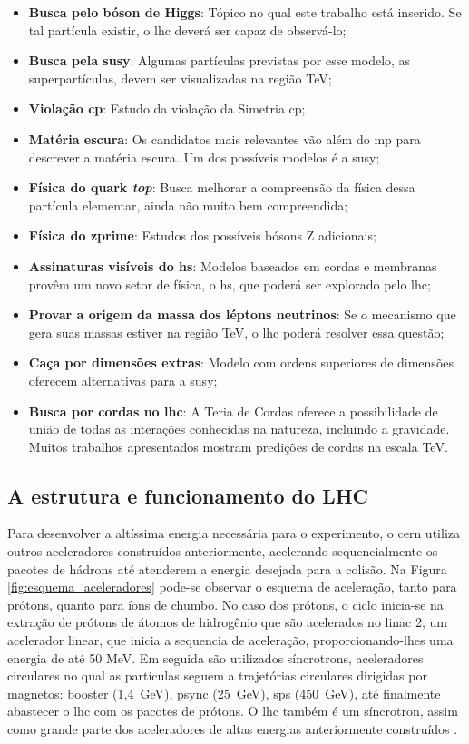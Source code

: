 \begin{itemize}
\item \textbf{Busca pelo bóson de Higgs}: Tópico no qual este trabalho está
inserido. Se tal partícula existir, o \gls{lhc} deverá ser capaz de observá-lo;
\item \textbf{Busca pela \gls{susy}}: Algumas partículas previstas por esse
modelo, as superpartículas, 
devem ser visualizadas na região TeV;
\item \textbf{Violação \gls{cp}}: Estudo da violação da Simetria \gls{cp};
\item \textbf{Matéria escura}: Os candidatos mais relevantes vão além do \gls{mp}
para descrever a matéria escura. Um dos possíveis modelos é a \gls{susy};
\item \textbf{Física do quark \emph{top}}: Busca melhorar a compreensão da física dessa
partícula elementar, ainda não muito bem compreendida;
\item \textbf{Física do \gls{zprime}}: Estudos dos possíveis bósons Z adicionais; 
\item \textbf{Assinaturas visíveis do \gls{hs}}: Modelos baseados em
cordas e membranas provêm um novo setor de física, o \gls{hs}, que poderá ser
explorado pelo \gls{lhc};
\item \textbf{Provar a origem da massa dos léptons neutrinos}: Se o mecanismo que gera
suas massas estiver na região TeV, o \gls{lhc} poderá resolver essa questão;
\item \textbf{Caça por dimensões extras}: Modelo com ordens superiores de dimensões
oferecem alternativas para a \gls{susy};
\item \textbf{Busca por cordas no \gls{lhc}}: A Teria de Cordas oferece a possibilidade de
união de todas as interações conhecidas na natureza, incluindo a gravidade. Muitos
trabalhos apresentados mostram predições de cordas na escala TeV.
\end{itemize}

\subsection{A estrutura e funcionamento do LHC}
\label{ssec:struct_lhc}

Para desenvolver a altíssima energia necessária para o experimento, o \gls{cern}
utiliza outros aceleradores construídos anteriormente, acelerando
sequencialmente os pacotes de hádrons até atenderem
a energia desejada para a colisão. Na Figura \ref{fig:esquema_aceleradores} pode-se observar
o esquema de aceleração, tanto para prótons, quanto para íons de chumbo. 
No caso dos prótons, o ciclo inicia-se na extração de prótons de átomos
de hidrogênio que são acelerados no \acrshort{linac} 2, um acelerador linear,
que inicia a sequencia de aceleração, proporcionando-lhes uma energia de até 50 MeV. 
Em seguida são utilizados síncrotrons, aceleradores circulares no qual as
partículas seguem a trajetórias circulares dirigidas por magnetos: \acrshort{booster} (1,4~GeV), 
\acrshort{psync} (25~GeV), \acrshort{sps} (450~GeV), até finalmente 
abastecer o \gls{lhc} com os pacotes de prótons. O \gls{lhc} também é um
síncrotron, assim como grande parte dos aceleradores de altas energias anteriormente 
construídos \cite{lecture_slides_1,lecture_slides_2}.

